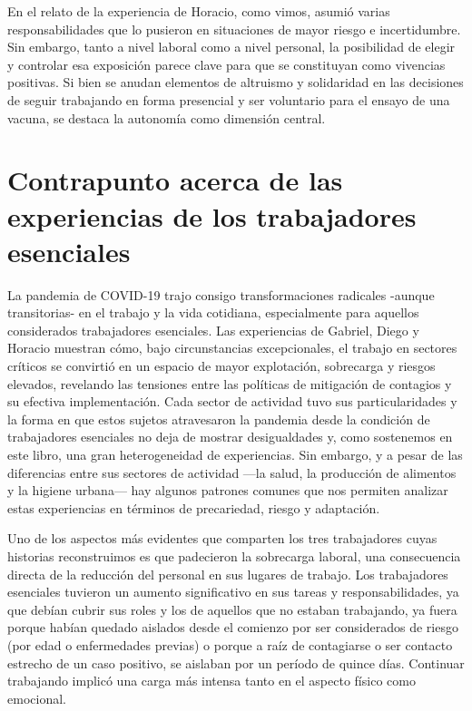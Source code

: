\begin{refsection}
\begin{gbcita}
\end{gbcita}

En el relato de la experiencia de Horacio, como vimos, asumió varias responsabilidades que lo pusieron en situaciones de mayor riesgo e incertidumbre. Sin embargo, tanto a nivel laboral como a nivel personal, la posibilidad de elegir y controlar esa exposición parece clave para que se constituyan como vivencias positivas. Si bien se anudan elementos de altruismo y solidaridad en las decisiones de seguir trabajando en forma presencial y ser voluntario para el ensayo de una vacuna, se destaca la autonomía como dimensión central.


\section[Contrapunto acerca de las experiencias de los trabajadores esenciales]{Contrapunto acerca de las experiencias de los trabajadores esenciales}
\label{cap-29.contrapunto-acerca-de-las-experiencias-de-los-trabajadores-esenciales}
La pandemia de COVID-19 trajo consigo transformaciones radicales -aunque transitorias- en el trabajo y la vida cotidiana, especialmente para aquellos considerados trabajadores esenciales. Las experiencias de Gabriel, Diego y Horacio muestran cómo, bajo circunstancias excepcionales, el trabajo en sectores críticos se convirtió en un espacio de mayor explotación, sobrecarga y riesgos elevados, revelando las tensiones entre las políticas de mitigación de contagios y su efectiva implementación. Cada sector de actividad tuvo sus particularidades y la forma en que estos sujetos atravesaron la pandemia desde la condición de trabajadores esenciales no deja de mostrar desigualdades y, como sostenemos en este libro, una gran heterogeneidad de experiencias. Sin embargo, y a pesar de las diferencias entre sus sectores de actividad —la salud, la producción de alimentos y la higiene urbana— hay algunos patrones comunes que nos permiten analizar estas experiencias en términos de precariedad, riesgo y adaptación.

Uno de los aspectos más evidentes que comparten los tres trabajadores cuyas historias reconstruimos es que padecieron la sobrecarga laboral, una consecuencia directa de la reducción del personal en sus lugares de trabajo. Los trabajadores esenciales tuvieron un aumento significativo en sus tareas y responsabilidades, ya que debían cubrir sus roles y los de aquellos que no estaban trabajando, ya fuera porque habían quedado aislados desde el comienzo por ser considerados de riesgo (por edad o enfermedades previas) o porque a raíz de contagiarse o ser contacto estrecho de un caso positivo, se aislaban por un período de quince días. Continuar trabajando implicó una carga más intensa tanto en el aspecto físico como emocional.


\end{refsection}
